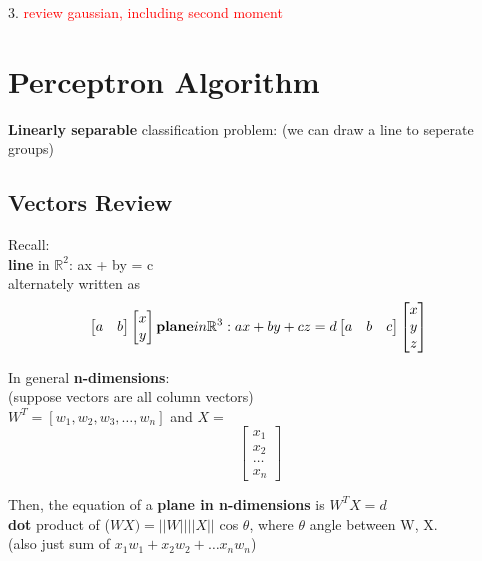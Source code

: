 \documentclass[12pt]{article}
\def\R{\ensuremath{\mathbb{R}}} %
\newcommand{\bt}[1]{\textbf{#1}} %
\begin{document}
3. 
\textcolor{red}{review gaussian, including second moment}

\section*{Perceptron Algorithm}

\bt{Linearly separable} classification problem: (we can draw a line to seperate groups)

\subsection*{Vectors Review}
Recall: \\
\bt{line} in $\R^2$: ax + by = c \\
alternately written as \\
\begin{equation}
\begin{bmatrix}
a & b 
\end{bmatrix}
\begin{bmatrix}
x \\
y
\end{bmatrix}\\
\bt{plane} in \R^3: ax + by + cz = d\\
\begin{bmatrix}
a & b & c 
\end{bmatrix}
\begin{bmatrix}
x \\
y \\
z
\end{bmatrix}\\
\end{equation}

In general \bt{n-dimensions}: \\
(suppose vectors are all column vectors)\\
$W^T = [w_1, w_2, w_3, \dots, w_n]$
and
$X =$
\begin{equation}
\begin{bmatrix}
x_1 \\
x_2 \\
\dots \\
x_n
\end{bmatrix}
\end{equation}

\noindent Then, the equation of a \bt{plane in n-dimensions} is $W^T X = d$\\

\noindent \bt{dot} product of ($W X) = ||W|| ||X||$ cos $\theta$, where $\theta$ angle between W, X.\\
(also just sum of $x_1w_1 + x_2 w_2 + \dots x_n w_n$)
\end{document}
